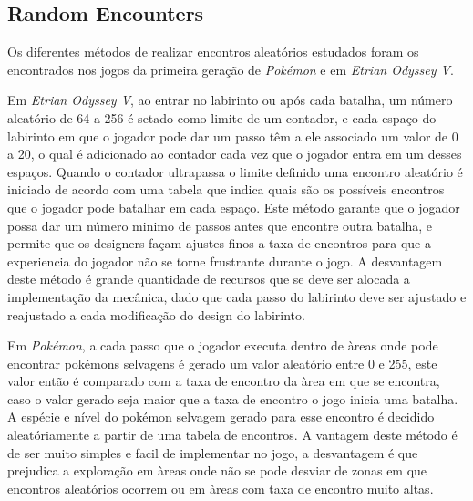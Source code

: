 \documentclass[
	12pt,				%
	openright,			%
	twoside,			%
	a4paper,			%
	english,			%
	french,				%
	spanish,			%
	brazil				%
	]{abntex2}
\begin{document}
\subsection{Random Encounters}

Os diferentes métodos de realizar encontros aleatórios estudados foram os encontrados nos jogos da primeira geração de \emph{Pokémon} e em \emph{Etrian Odyssey V}.

Em \emph{Etrian Odyssey V}, ao entrar no labirinto ou após cada batalha, um número aleatório de 64 a 256 é setado como limite de um contador, e cada espaço do labirinto em que o jogador pode dar um passo têm a ele associado um valor de 0 a 20, o qual é adicionado ao contador cada vez que o jogador entra em um desses espaços. Quando o contador ultrapassa o limite definido uma encontro aleatório é iniciado de acordo com uma tabela que indica quais são os possíveis encontros que o jogador pode batalhar em cada espaço. Este método garante que o jogador possa dar um número minimo de passos antes que encontre outra batalha, e permite que os designers façam ajustes finos a taxa de encontros para que a experiencia do jogador não se torne frustrante durante o jogo. A desvantagem deste método é grande quantidade de recursos que se deve ser alocada a implementação da mecânica, dado que cada passo do labirinto deve ser ajustado e reajustado a cada modificação do design do labirinto.

Em \emph{Pokémon}, a cada passo que o jogador executa dentro de àreas onde pode encontrar pokémons selvagens é gerado um valor aleatório entre 0 e 255, este valor então é comparado com a taxa de encontro da àrea em que se encontra, caso o valor gerado seja maior que a taxa de encontro o jogo inicia uma batalha. A espécie e nível do pokémon selvagem gerado para esse encontro é decidido aleatóriamente a partir de uma tabela de encontros. A vantagem deste método é de ser muito simples e facil de implementar no jogo, a desvantagem é que prejudica a exploração em àreas onde não se pode desviar de zonas em que encontros aleatórios ocorrem ou em àreas com taxa de encontro muito altas.




%
%
\end{document}
